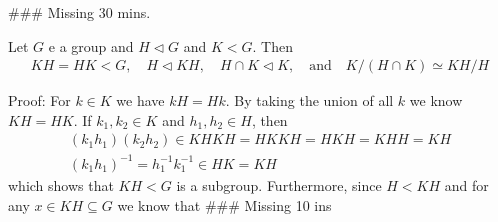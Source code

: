 \#\#\# Missing 30 mins.




\begin{corollary}
Let $G$ e a group and $H \lhd G$ and $K < G$. Then
\begin{align*}
	KH = HK < G, \quad H \lhd KH, \quad H \cap K \lhd K, \quad \text{and} \quad K/(H\cap K)	 \simeq KH/H
\end{align*}
\end{corollary}
Proof: For $k \in K$ we have $kH = Hk$. By taking the union of all $k$ we know $KH = HK$.
If $k_1,k_2 \in K$ and $h_1,h_2 \in H$, then
\begin{align*}
	(k_1h_1)(k_2h_2) \in KHKH = HKKH = HKH = KHH = KH\\
	(k_1h_1)^{-1} = h_1^{-1}k_1^{-1} \in HK = KH	
\end{align*}
which shows that $KH < G$ is a subgroup. Furthermore, since $H < KH$ and for any $x \in KH \subseteq G$ we know that \#\#\# Missing 10 ins


